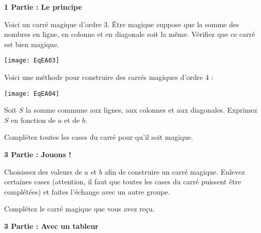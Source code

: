 \begin{TP}

\vspace{1em}\textbf{1 Partie : Le principe}\vspace{1em}

\item Voici un carré magique d'ordre 3. \og Être magique \fg suppose que la somme des nombres en ligne, en colonne et en diagonale soit la même. Vérifiez que ce carré est bien magique.

\vspace{1em}

\begin{center}
    \texttt{[image: EqEA03]}
\end{center}

\vspace{1em}

Voici une méthode pour construire des carrés magiques d'ordre 4 :

\vspace{1em}

\begin{center}
    \texttt{[image: EqEA04]}
\end{center}

\vspace{1em}

\item Soit $S$ la somme commune aux lignes, aux colonnes et aux diagonales. Exprimez $S$ en fonction de $a$ et de $b$.
\item\label{EQtp01} Complétez toutes les cases du carré pour qu'il soit magique.


\vspace{1em}\textbf{3 Partie : Jouons !}\vspace{1em}

\item Choisissez des valeurs de $a$ et $b$ afin de construire un carré magique. Enlevez certaines cases (attention, il faut que toutes les cases du carré puissent être complétées) et faites l'échange avec un autre groupe.

\vspace{.5em}

Complétez le carré magique que vous avez reçu.

\vspace{1em}\textbf{3 Partie : Avec un tableur}\vspace{1em}


\end{TP}
